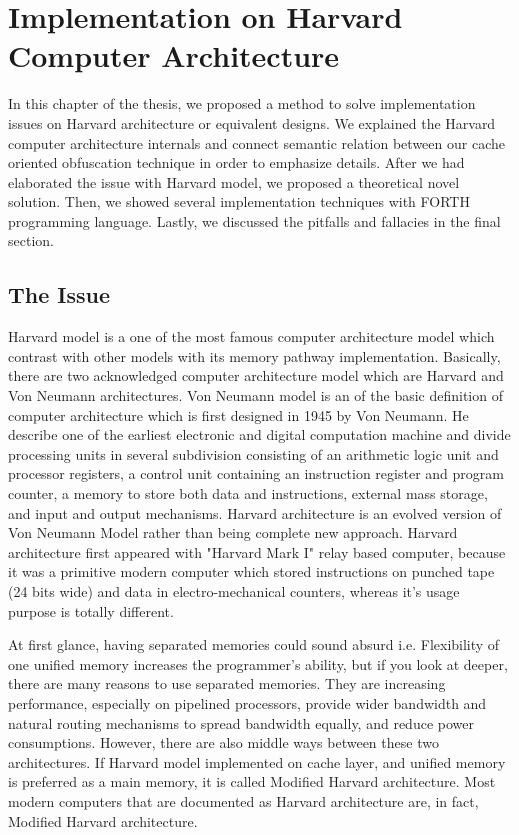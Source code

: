 \chapter{Implementation on Harvard Computer Architecture}
In this chapter of the thesis, we proposed a method to solve implementation issues on Harvard architecture or equivalent designs. We explained the Harvard computer architecture internals and connect semantic relation between our cache oriented obfuscation technique in order to emphasize details. After we had elaborated the issue with Harvard model, we proposed a theoretical novel solution. Then, we showed several implementation techniques with FORTH programming language. Lastly, we discussed the pitfalls and fallacies in the final section.

\section{The Issue}
	Harvard model is a one of the most famous computer architecture model which contrast with other models with its memory pathway implementation. Basically, there are two acknowledged computer architecture model which are Harvard and Von Neumann architectures. Von Neumann model is an of the basic definition of computer architecture which is first designed in 1945 by Von Neumann\cite{von1993first}.  He describe one of the earliest electronic and digital computation machine and divide processing units in several subdivision consisting of an arithmetic logic unit and processor registers, a control unit containing an instruction register and program counter, a memory to store both data and instructions, external mass storage, and input and output mechanisms. Harvard architecture is an evolved version of Von Neumann Model rather than being complete new approach. Harvard architecture first appeared with "Harvard Mark I" relay based computer, because it was a primitive modern computer which stored instructions on punched tape (24 bits wide) and data in electro-mechanical counters, whereas it's usage purpose is totally different.

	At first glance, having separated memories could sound absurd i.e. Flexibility of one unified memory increases the programmer's ability, but if you look at deeper, there are many reasons to use separated memories. They are increasing performance, especially on pipelined processors, provide wider bandwidth and natural routing mechanisms to spread bandwidth equally, and reduce power consumptions. However, there are also middle ways between these two architectures. If Harvard model implemented on cache layer, and unified memory is preferred as a main memory, it is called Modified Harvard architecture. Most modern computers that are documented as Harvard architecture are, in fact, Modified Harvard architecture.


